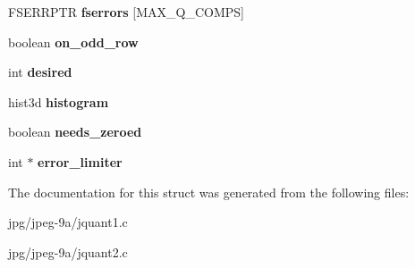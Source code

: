\begin{DoxyCompactItemize}
\item 
\hypertarget{structmy__cquantizer_a486b351b769e8cdfc832dc33309c7069}{F\+S\+E\+R\+R\+P\+T\+R {\bfseries fserrors} \mbox{[}M\+A\+X\+\_\+\+Q\+\_\+\+C\+O\+M\+P\+S\mbox{]}}\label{structmy__cquantizer_a486b351b769e8cdfc832dc33309c7069}

\item 
\hypertarget{structmy__cquantizer_a7745a27202b6a562461aa19ecf74638d}{boolean {\bfseries on\+\_\+odd\+\_\+row}}\label{structmy__cquantizer_a7745a27202b6a562461aa19ecf74638d}

\item 
\hypertarget{structmy__cquantizer_aa960fa399af744fcdbf9c07ab9bd956e}{int {\bfseries desired}}\label{structmy__cquantizer_aa960fa399af744fcdbf9c07ab9bd956e}

\item 
\hypertarget{structmy__cquantizer_a108a22411249dc52d196fa5a1ee50173}{hist3d {\bfseries histogram}}\label{structmy__cquantizer_a108a22411249dc52d196fa5a1ee50173}

\item 
\hypertarget{structmy__cquantizer_a06c9d37b470ec1e88502a32a5a73b12c}{boolean {\bfseries needs\+\_\+zeroed}}\label{structmy__cquantizer_a06c9d37b470ec1e88502a32a5a73b12c}

\item 
\hypertarget{structmy__cquantizer_a2af4df34ba2e1a9081f0dc3a661066e7}{int $\ast$ {\bfseries error\+\_\+limiter}}\label{structmy__cquantizer_a2af4df34ba2e1a9081f0dc3a661066e7}

\end{DoxyCompactItemize}


The documentation for this struct was generated from the following files\+:\begin{DoxyCompactItemize}
\item 
jpg/jpeg-\/9a/jquant1.\+c\item 
jpg/jpeg-\/9a/jquant2.\+c\end{DoxyCompactItemize}
